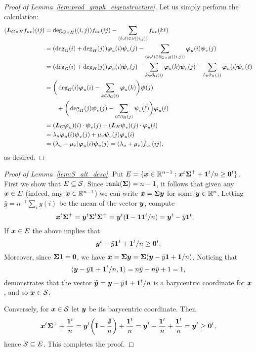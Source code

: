 \begin{proof}[Proof of Lemma~\ref{lem:prod_graph_eigenstructure}]
	Let us  simply perform the calculation:
	\begin{align*}
	(\vb*{L}_{G\times H} f_{uv})(ij) &= \deg_{G\times H}((i,j))f_{uv}(ij) - \sum_{(k,\ell)\in \partial((i,j))} f_{uv}(k\ell) \\
	&= (\deg_G(i)+\deg_H(j))\vb*{\varphi}_u(i)\vb*{\psi}_v(j) - \sum_{(k,\ell)\in \partial_{G\times H}((i,j))} \vb*{\varphi}_u(i)\vb*{\psi}_v(j) \\
	&= (\deg_G(i)+\deg_H(j))\vb*{\varphi}_u(i)\vb*{\psi}_v(j) - \sum_{k\in \partial_G(i)} \vb*{\varphi}_u(k)\vb*{\psi}_v(j) - \sum_{\ell\in \partial_H(j)} \vb*{\varphi}_u(i)\vb*{\psi}_v(\ell) \\
	&=\bigg(\deg_G(i)\vb*{\varphi}_u(i) - \sum_{k\in\partial_G(i)}\vb*{\varphi}_u(k)\bigg)\vb*{\psi}(j) \\
	&\qquad + \bigg(\deg_H(j)\vb*{\psi}_v(j)-\sum_{\ell\in\partial_H(j)}\vb*{\psi}_v(\ell)\bigg)\vb*{\varphi}_u(i) \\
	&= (\vb*{L}_G \vb*{\varphi}_u)(i) \cdot \vb*{\psi}_v(j) + (\vb*{L}_H\vb*{\psi}_v)(j)\cdot \vb*{\varphi}_u(i) \\
	&= \lambda_u\vb*{\varphi}_u(i) \vb*{\psi}_v(j) + \mu_v\vb*{\psi}_v(j)\vb*{\varphi}_u(i) \\
	&= (\lambda_u+\mu_v)\vb*{\varphi}_u(i)\vb*{\psi}_v(j) = (\lambda_u+\mu_v)f_{uv}(ij),
	\end{align*}
	as desired.
\end{proof}

\begin{proof}[Proof of Lemma~\ref{lem:S_alt_desc}]
	Put $E=\{\vb*{x}\in \mathbb{R}^{n-1}:\vb*{x}^t\boldsymbol{\Sigma}^++\vb{1}^t/n\geq \vb{0}^t\}$. First we show that $E\subseteq\mathcal{S}$. 
	Since $\rank(\boldsymbol{\Sigma})=n-1$, it follows that given any $\vb*{x}\in E$ (indeed, any $\vb*{x}\in\mathbb{R}^{n-1}$) we can write $\vb*{x}=\boldsymbol{\Sigma}\vb*{y}$ for some $\vb*{y}\in\mathbb{R}^n$. Letting $\bar{y}=n^{-1}\sum_i y(i)$ be the mean of the vector $\vb*{y}$, compute
	\begin{align*}
	\vb*{x}^t\boldsymbol{\Sigma}^+ &= \vb*{y}^t \boldsymbol{\Sigma}^t\boldsymbol{\Sigma}^+ = \vb*{y}^t(\vb{I}-\vb{1}\vb{1}^t/n)=\vb*{y}^t - \bar{y}\vb{1}^t.
	\end{align*}
	If $\vb*{x}\in E$ the above implies that 
	\[\vb*{y}^t-\bar{y}\vb{1}^t + \vb{1}^t/n\geq \vb{0}^t.\]
	Moreover, since $\boldsymbol{\Sigma}\vb{1}=\vb{0}$, we have $\vb*{x}=\boldsymbol{\Sigma}\vb*{y}=\boldsymbol{\Sigma}(\vb*{y}-\bar{y}\vb{1} +\vb{1}/n)$. Noticing that 
	\[\langle \vb*{y}-\bar{y}\vb{1}+\vb{1}^t/n,\vb{1}\rangle = n\bar{y}-n\bar{y}+1=1,\]
	demonstrates that the vector $\widetilde{\vb*{y}}=\vb*{y}-\bar{y}\vb{1}+\vb{1}^t/n$ is a barycentric coordinate for $\vb*{x}$, and so $\vb*{x}\in \mathcal{S}$. 
	
	Conversely, for $\vb*{x}\in\mathcal{S}$ let $\vb*{y}$ be its barycentric coordinate. Then 
	\[\vb*{x}^t\boldsymbol{\Sigma}^++\frac{\vb{1}^t}{n}=\vb*{y}^t\bigg(\vb{I}-\frac{\vb{J}}{n}\bigg)+\frac{\vb{1}^t}{n}=\vb*{y}^t - \frac{\vb{1}^t}{n}+\frac{\vb{1}^t}{n}=\vb*{y}^t\geq \vb{0}^t, \]
	hence $\mathcal{S}\subseteq E$. This completes the proof. 
\end{proof}

